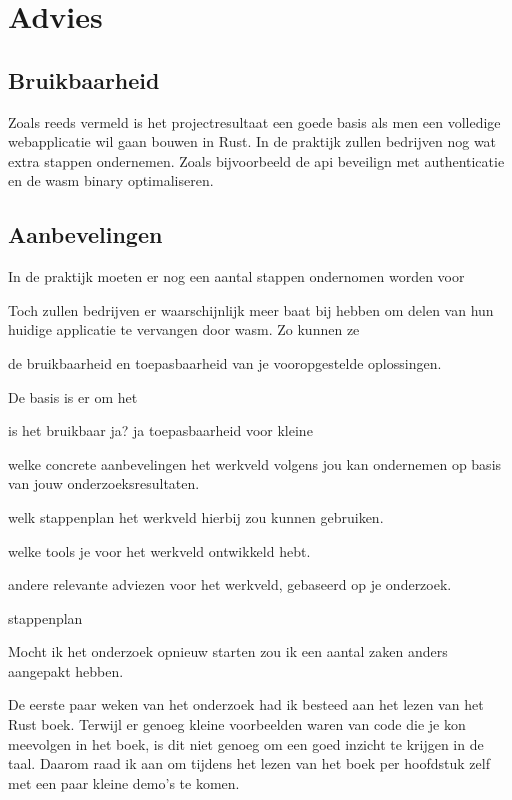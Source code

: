 \chapter{Advies}

\section{Bruikbaarheid}

Zoals reeds vermeld is het projectresultaat een goede basis als men een volledige webapplicatie wil
gaan bouwen in Rust. In de praktijk zullen bedrijven nog wat extra stappen ondernemen. Zoals
bijvoorbeeld de api beveilign met authenticatie en de wasm binary optimaliseren.



\section{Aanbevelingen}



In de praktijk moeten er nog een aantal stappen ondernomen worden voor 

Toch zullen bedrijven er waarschijnlijk meer baat bij hebben om delen van hun huidige applicatie te
vervangen door wasm. Zo kunnen ze 



de bruikbaarheid en toepasbaarheid van je vooropgestelde oplossingen.

De basis is er om het 


is het bruikbaar ja? ja
toepasbaarheid voor kleine  

welke concrete aanbevelingen het werkveld volgens jou kan ondernemen op basis van jouw onderzoeksresultaten.

welk stappenplan het werkveld hierbij zou kunnen gebruiken.

welke tools je voor het werkveld ontwikkeld hebt.

andere relevante adviezen voor het werkveld, gebaseerd op je onderzoek.


stappenplan

Mocht ik het onderzoek opnieuw starten zou ik een aantal zaken anders aangepakt hebben.

De eerste paar weken van het onderzoek had ik besteed aan het lezen van het Rust boek. Terwijl er
genoeg kleine voorbeelden waren van code die je kon meevolgen in het boek, is dit niet genoeg om
een goed inzicht te krijgen in de taal. Daarom raad ik aan om tijdens het lezen van het boek per
hoofdstuk zelf met een paar kleine demo's te komen.


